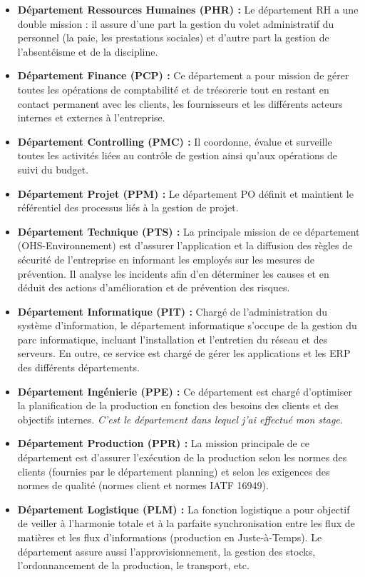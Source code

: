 \begin{itemize}
    \item \textbf{Département Ressources Humaines (PHR) :} Le département RH a une double mission : il assure d'une part la gestion du volet administratif du personnel (la paie, les prestations sociales) et d'autre part la gestion de l'absentéisme et de la discipline.
    
    \item \textbf{Département Finance (PCP) :} Ce département a pour mission de gérer toutes les opérations de comptabilité et de trésorerie tout en restant en contact permanent avec les clients, les fournisseurs et les différents acteurs internes et externes à l'entreprise.
    
    \item \textbf{Département Controlling (PMC) :} Il coordonne, évalue et surveille toutes les activités liées au contrôle de gestion ainsi qu'aux opérations de suivi du budget.
    
    \item \textbf{Département Projet (PPM) :} Le département PO définit et maintient le référentiel des processus liés à la gestion de projet.
    
    \item \textbf{Département Technique (PTS) :} La principale mission de ce département (OHS-Environnement) est d'assurer l'application et la diffusion des règles de sécurité de l'entreprise en informant les employés sur les mesures de prévention. Il analyse les incidents afin d'en déterminer les causes et en déduit des actions d'amélioration et de prévention des risques.
    
    \item \textbf{Département Informatique (PIT) :} Chargé de l'administration du système d'information, le département informatique s'occupe de la gestion du parc informatique, incluant l'installation et l'entretien du réseau et des serveurs. En outre, ce service est chargé de gérer les applications et les ERP des différents départements.
    
    \item \textbf{Département Ingénierie (PPE) :} Ce département est chargé d'optimiser la planification de la production en fonction des besoins des clients et des objectifs internes. \textit{C'est le département dans lequel j'ai effectué mon stage.}
    
    \item \textbf{Département Production (PPR) :} La mission principale de ce département est d'assurer l'exécution de la production selon les normes des clients (fournies par le département planning) et selon les exigences des normes de qualité (normes client et normes IATF 16949).
    
    \item \textbf{Département Logistique (PLM) :} La fonction logistique a pour objectif de veiller à l'harmonie totale et à la parfaite synchronisation entre les flux de matières et les flux d'informations (production en Juste-à-Temps). Le département assure aussi l'approvisionnement, la gestion des stocks, l'ordonnancement de la production, le transport, etc.
\end{itemize}